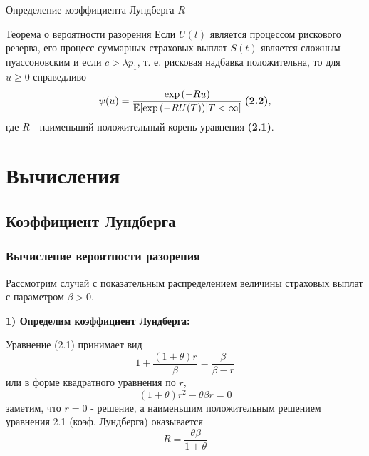 \documentclass[10pt]{beamer}
\newcommand\Exp{{\rm exp \,}}
\begin{document}
\begin{frame}
\begin{center}

    Определение коэффициента Лундберга $R$
\end{center}
\end{frame}

\begin{frame}
\begin{block}{Теорема о вероятности разорения}
Если $U(t)$ является процессом рискового резерва, его процесс суммарных страховых выплат $S(t)$ является сложным пуассоновским и если $c > \lambda p_{1}$, т. е. рисковая надбавка положительна, то для $u \geq 0$ справедливо $$
    \psi(u) = \frac{\Exp(-Ru)}{\mathbb{E}[\Exp(-RU(T))|T < \infty]} \: \textbf{(2.2)}, $$ где $R$ - наименьший положительный корень уравнения \textbf{(2.1)}.
\end{block}

\end{frame}


\section{Вычисления}
\subsection{Коэффициент Лундберга}
\begin{frame}
\frametitle{Вычисление вероятности разорения}
Рассмотрим случай с показательным распределением величины страховых выплат с параметром $\beta > 0$.

\textbf{1) Определим коэффициент Лундберга:}

\noindent
Уравнение (2.1) принимает вид
\begin{equation}
1 + \frac{(1 + \theta)r}{\beta}=\frac{\beta}{\beta-r}
\end{equation}
или в форме квадратного уравнения по $r$,
\begin{equation}
(1 + \theta)r^2 - \theta\beta r = 0
\end{equation}
заметим, что $r = 0$ - решение, а наименьшим положительным решением уравнения 2.1
(коэф. Лундберга) оказывается
\begin{equation}
R = \frac{\theta\beta}{1 + \theta}
\end{equation}
\end{frame}
\end{document}
